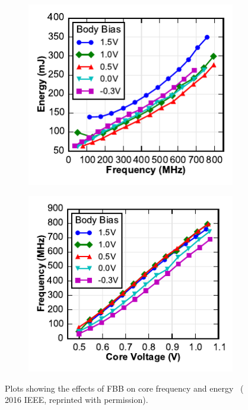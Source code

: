 \documentclass[graybox]{svmult}
\begin{document}
\begin{figure}
  \centering
  \hspace*{\fill}
  \begin{subfigure}[t]{0.4\textwidth}
  \centering
  \includegraphics[width=\textwidth]{6-raven4-shmoo-a}
  \caption{}
  \label{fig:6-raven4-shmoo-a}
  \end{subfigure}
  \hspace*{\fill}
  \begin{subfigure}[t]{0.4\textwidth}
  \centering
  \includegraphics[width=\textwidth]{6-raven4-shmoo-b}
  \caption{}
  \label{fig:6-raven4-shmoo-b}
  \end{subfigure}
  \hspace*{\fill}
  \caption{Plots showing the effects of FBB on core frequency and energy~\cite{Keller2016} ({\textcopyright} 2016 IEEE, reprinted with permission).}
  \label{fig:6-raven4-shmoo}
\end{figure}
\end{document}
